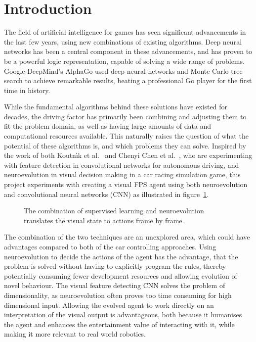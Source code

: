 
\section{Introduction}
The field of artificial intelligence for games has seen significant advancements in the last few years, using new combinations of existing algorithms. Deep neural networks has been a central component in these advancements, and has proven to be a powerful logic representation, capable of solving a wide range of problems. Google DeepMind's AlphaGo\cite{christian} used deep neural networks and Monte Carlo tree search to achieve remarkable results, beating a professional Go player for the first time in history.

While the fundamental algorithms behind these solutions have existed for decades, the driving factor has primarily been combining and adjusting them to fit the problem domain, as well as having large amounts of data and computational resources available. This naturally raises the question of what the potential of these algorithms is, and which problems they can solve. Inspired by the work of both Koutn\'{\i}k et al.~\cite{torcs} and Chenyi Chen et al.~\cite{chen}, who are experimenting with feature detection in convolutional networks for autonomous driving, and neuroevolution in visual decision making in a car racing simulation game, this project experiments with creating a visual FPS agent using both neuroevolution and convolutional neural networks (CNN) as illustrated in figure~\ref{fig:architecture}.

\begin{figure}[H]
	\begin{scriptsize}
		\sffamily
		\def\svgwidth{\textwidth}
		
		\vspace{-45mm}
	\end{scriptsize}
	\caption{The combination of supervised learning and neuroevolution translates the visual state to actions frame by frame.}
	\label{fig:architecture}
\end{figure}

The combination of the two techniques are an unexplored area, which could have advantages compared to both of the car controlling approaches. Using neuroevolution to decide the actions of the agent has the advantage, that the problem is solved without having to explicitly program the rules, thereby potentially consuming fewer development resources and allowing evolution of novel behaviour. The visual feature detecting CNN solves the problem of dimensionality, as neuroevolution often proves too time consuming for high dimensional input. Allowing the evolved agent to work directly on an interpretation of the visual output is advantageous, both because it humanises the agent and enhances the entertainment value of interacting with it, while making it more relevant to real world robotics. 

